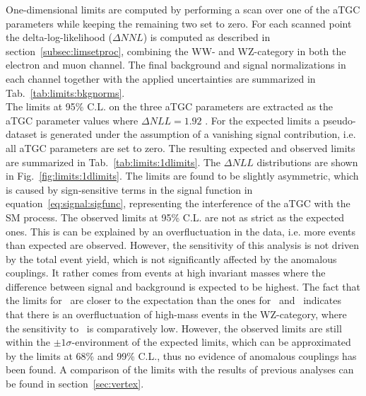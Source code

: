 One-dimensional limits are computed by performing a scan over one of the aTGC parameters while keeping the remaining two set to zero. For each scanned point the delta-log-likelihood ($\Delta NNL$) is computed as described in section~\ref{subsec:limsetproc}, combining the WW- and WZ-category in both the electron and muon channel. The final background and signal normalizations in each channel together with the applied uncertainties are summarized in Tab.~\ref{tab:limits:bkgnorms}.\\

\noindent The limits at 95\% C.L. on the three aTGC parameters are extracted as the aTGC parameter values where $\Delta NLL=1.92$ \cite{cowan}. For the expected limits a pseudo-dataset is generated under the assumption of a vanishing signal contribution, i.e. all aTGC parameters are set to zero. The resulting expected and observed limits are summarized in Tab.~\ref{tab:limits:1dlimits}. The $\Delta NLL$ distributions are shown in Fig.~\ref{fig:limits:1dlimits}. The limits are found to be slightly asymmetric, which is caused by sign-sensitive terms in the signal function in equation~\ref{eq:signal:sigfunc}, representing the interference of the aTGC with the SM process. The observed limits at 95\% C.L. are not as strict as the expected ones. This is can be explained by an overfluctuation in the data, i.e. more events than expected are observed. However, the sensitivity of this analysis is not driven by the total event yield, which is not significantly affected by the anomalous couplings. It rather comes from events at high invariant masses where the difference between signal and background is expected to be highest. The fact that the limits for \Tcb \ are closer to the expectation than the ones for \Tcwww \ and \Tccw \ indicates that there is an overfluctuation of high-mass events in the WZ-category, where the sensitivity to \Tcb \ is comparatively low. However, the observed limits are still within the $\pm 1\sigma$-environment of the expected limits, which can be approximated by the limits at 68\% and 99\% C.L., thus no evidence of anomalous couplings has been found. A comparison of the limits with the results of previous analyses can be found in section~\ref{sec:vertex}.\\

